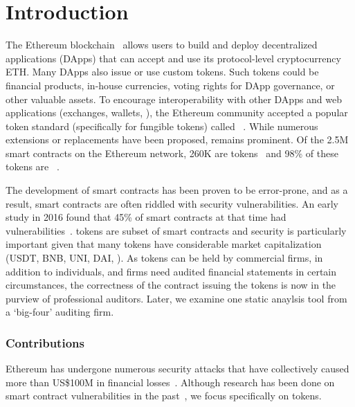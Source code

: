 
\section{Introduction}\label{sect:introduction}
The Ethereum blockchain~\cite{EthGit,EIP150} allows users to build and deploy decentralized applications (DApps) that can accept and use its protocol-level cryptocurrency ETH. Many DApps also issue or use custom tokens. Such tokens could be financial products, in-house currencies, voting rights for DApp governance, or other valuable assets. To encourage interoperability with other DApps and web applications (exchanges, wallets, \etc), the Ethereum community accepted a popular token standard (specifically for fungible tokens) called \erc~\cite{ERC20Std}. While numerous \erc extensions or replacements have been proposed, \erc remains prominent. Of the 2.5M~\cite{Alethio} smart contracts on the Ethereum network, 260K are tokens~\cite{TokenTracker} and 98\% of these tokens are \erc~\cite{EtherScan}. 

The development of smart contracts has been proven to be error-prone, and as a result, smart contracts are often riddled with security vulnerabilities. An early study in 2016 found that 45\% of smart contracts at that time had vulnerabilities~\cite{MakSm}. \erc tokens are subset of smart contracts and security is particularly important given that many tokens have considerable market capitalization (\eg USDT, BNB, UNI, DAI, \etc). As tokens can be held by commercial firms, in addition to individuals, and firms need audited financial statements in certain circumstances, the correctness of the contract issuing the tokens is now in the purview of professional auditors. Later, we examine one static anaylsis tool from a `big-four' auditing firm.

\subsubsection*{Contributions} Ethereum has undergone numerous security attacks that have collectively caused more than US\$100M in financial losses~\cite{DAO1,PeckShield,PartiyMultiSig,MyEthWallet,ParityFirstHack,ParitySecondHack}. Although research has been done on smart contract vulnerabilities in the past~\cite{EthSecServ}, we focus specifically on \erc tokens. 

